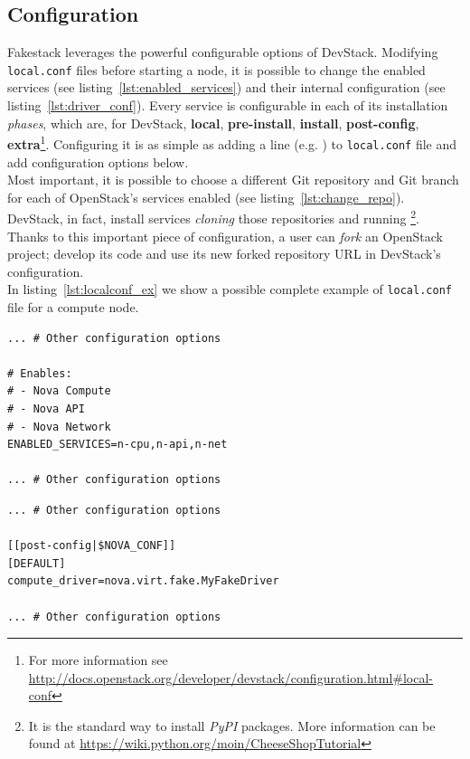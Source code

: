 \subsection{Configuration}
\label{sub:fakestack_conf}

Fakestack leverages the powerful configurable options of DevStack. Modifying \texttt{local.conf} files before starting a node, it is possible to change the enabled services (see listing~\ref{lst:enabled_services}) and their internal configuration (see listing~\ref{lst:driver_conf}). Every service is configurable in each of its installation \textit{phases}, which are, for DevStack, \textbf{local}, \textbf{pre-install}, \textbf{install}, \textbf{post-config}, \textbf{extra}\footnote{For more information see \url{http://docs.openstack.org/developer/devstack/configuration.html\#local-conf}}. Configuring it is as simple as adding a  line (e.g. ) to \texttt{local.conf} file and add configuration options below.\\
Most important, it is possible to choose a different Git repository and Git branch for each of OpenStack's services enabled (see listing~\ref{lst:change_repo}). DevStack, in fact, install services \textit{cloning} those repositories and running \footnote{\label{note:pypi}It is the standard way to install \textit{PyPI} packages. More information can be found at \url{https://wiki.python.org/moin/CheeseShopTutorial}}.\\
Thanks to this important piece of configuration, a user can \textit{fork} an OpenStack project; develop its code and use its new forked repository URL in DevStack's configuration.\\
In listing~\ref{lst:localconf_ex} we show a possible complete example of \texttt{local.conf} file for a compute node.

\begin{lstlisting}[float, floatplacement=H, caption={Choose OpenStack's enabled services}, label={lst:enabled_services}, numbers=none]
... # Other configuration options

# Enables:
# - Nova Compute
# - Nova API
# - Nova Network
ENABLED_SERVICES=n-cpu,n-api,n-net

... # Other configuration options
\end{lstlisting}

\begin{lstlisting}[float, floatplacement=H, caption={Internal configuration of Nova}, label={lst:driver_conf}, numbers=none]
... # Other configuration options

[[post-config|$NOVA_CONF]]
[DEFAULT]
compute_driver=nova.virt.fake.MyFakeDriver

... # Other configuration options
\end{lstlisting}

